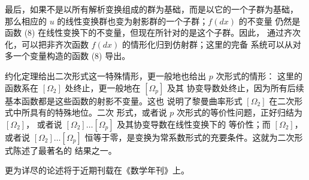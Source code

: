 最后，如果不是以所有解析变换组成的群为基础，而是以它的一个子群为基础，
那么相应的 \(u\) 的线性变换群也变为射影群的一个子群；\(f(dx)\) 的不变量
仍然是函数 (8) 在线性变换下的不变量，但现在所针对的是这个子群。因此，
通过齐次化，可以把非齐次函数 \(f(dx)\) 的情形化归到仿射群；这里的完备
系统可以从对多一个变量构造的函数 (8) 导出。

约化定理给出二次形式这一特殊情形，更一般地也给出 \(p\) 次形式的情形：
这里的函数系在 \([\Omega_2]\) 处终止，更一般地在 \([\Omega_p]\) 及其
协变导数处终止，因为所有后续基本函数都是这些函数的射影不变量。这也
说明了黎曼曲率形式 \([\Omega_2]\) 在二次形式中所具有的特殊地位。二次
形式，或者说 \(p\) 次形式的等价性问题，正好归结为 \([\Omega_2]\)，
或者说 \([\Omega_2]\ldots[\Omega_p]\) 及其协变导数在线性变换下的
等价性；而 \([\Omega_2]\)，或者说 \([\Omega_2]\ldots[\Omega_p]\)
恒等于零，是变换为常系数形式的充要条件。这就为二次形式陈述了最著名的
结果之一。

更为详尽的论述将于近期刊载在《数学年刊》上。

\clearpage
\setcounter{footnote}{0}
